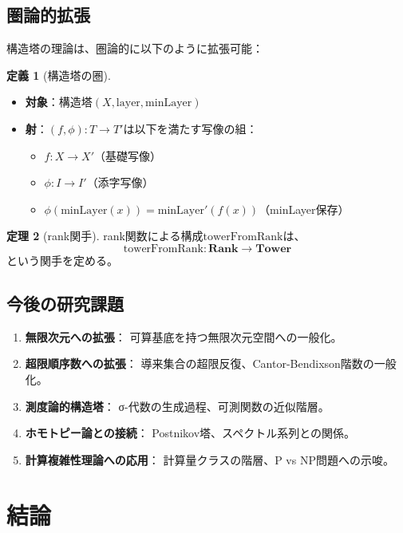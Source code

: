 \documentclass[a4paper,12pt]{ltjsarticle}
\theoremstyle{definition}
\newtheorem{definition}{定義}[section]
\newtheorem{theorem}[definition]{定理}
\begin{document}
\subsection{圏論的拡張}

構造塔の理論は、圏論的に以下のように拡張可能：

\begin{definition}[構造塔の圏]
\begin{itemize}
\item \textbf{対象}：構造塔$(X, \text{layer}, \text{minLayer})$
\item \textbf{射}：$(f, \phi): T \to T'$は以下を満たす写像の組：
\begin{itemize}
\item $f: X \to X'$（基礎写像）
\item $\phi: I \to I'$（添字写像）
\item $\phi(\text{minLayer}(x)) = \text{minLayer}'(f(x))$（minLayer保存）
\end{itemize}
\end{itemize}
\end{definition}

\begin{theorem}[rank関手]
rank関数による構成$\text{towerFromRank}$は、
$$\text{towerFromRank}: \mathbf{Rank} \to \mathbf{Tower}$$
という関手を定める。
\end{theorem}

\subsection{今後の研究課題}

\begin{enumerate}
\item \textbf{無限次元への拡張}：
可算基底を持つ無限次元空間への一般化。

\item \textbf{超限順序数への拡張}：
導来集合の超限反復、Cantor-Bendixson階数の一般化。

\item \textbf{測度論的構造塔}：
σ-代数の生成過程、可測関数の近似階層。

\item \textbf{ホモトピー論との接続}：
Postnikov塔、スペクトル系列との関係。

\item \textbf{計算複雑性理論への応用}：
計算量クラスの階層、P vs NP問題への示唆。
\end{enumerate}

\section{結論}
\end{document}
